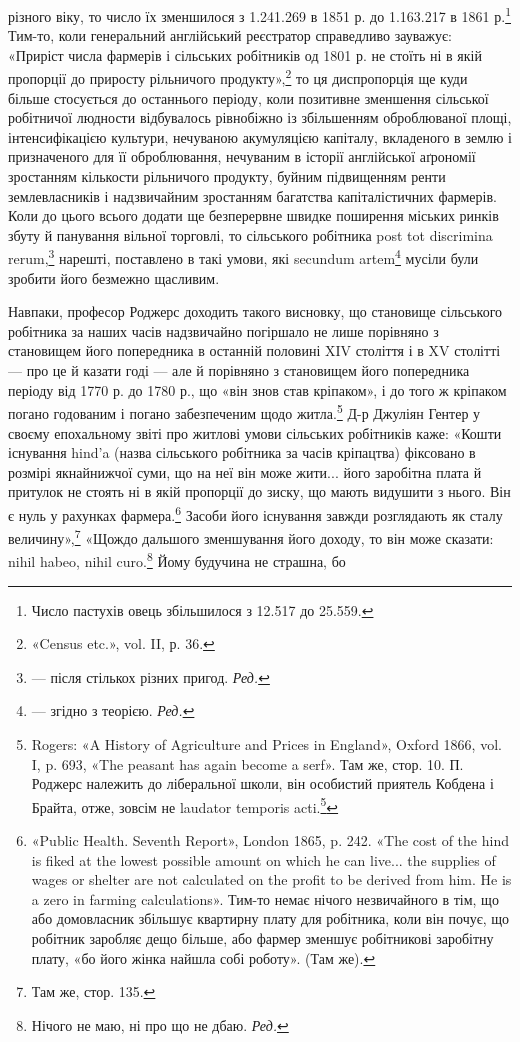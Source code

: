 різного віку, то число їх зменшилося з 1.241.269 в 1851 р. до
1.163.217 в 1861 р.\footnote{
Число пастухів овець збільшилося з 12.517 до 25.559.
} Тим-то, коли генеральний англійський
реєстратор справедливо зауважує: «Приріст числа фармерів і
сільських робітників од 1801 р. не стоїть ні в якій пропорції
до приросту рільничого продукту»,\footnote{
«Census etc.», vol. II, р. 36.
} то ця диспропорція ще
куди більше стосується до останнього періоду, коли позитивне
зменшення сільської робітничої людности відбувалось рівнобіжно
із збільшенням оброблюваної площі, інтенсифікацією культури,
нечуваною акумуляцією капіталу, вкладеного в землю і призначеного
для її оброблювання, нечуваним в історії англійської
аґрономії зростанням кількости рільничого продукту, буйним
підвищенням ренти землевласників і надзвичайним зростанням
багатства капіталістичних фармерів. Коли до цього всього додати
ще безперервне швидке поширення міських ринків збуту й
панування вільної торговлі, то сільського робітника post tot
discrimina rerum,\footnote*{
— після стількох різних пригод. \emph{Ред.}
} нарешті, поставлено в такі умови, які secundum
artem\footnote*{
— згідно з теорією. \emph{Ред.}
} мусіли були зробити його безмежно щасливим.

Навпаки, професор Роджерс доходить такого висновку, що
становище сільського робітника за наших часів надзвичайно
погіршало не лише порівняно з становищем його попередника
в останній половині XIV століття і в XV столітті — про це й
казати годі — але й порівняно з становищем його попередника
періоду від 1770 р. до 1780 р., що «він знов став кріпаком», і
до того ж кріпаком погано годованим і погано забезпеченим щодо
житла.\footnote{
Rogers: «A History of Agriculture and Prices in England», Oxford
1866, vol. I, p. 693, «The peasant has again become a serf». Там же, стор. 10.
П. Роджерс належить до ліберальної школи, він особистий приятель
Кобдена і Брайта, отже, зовсім не laudator temporis acti.\footnote*{
— хвалій минулих часів. \emph{Ред.}
}
} Д-р Джуліян Гентер у своєму епохальному звіті про
житлові умови сільських робітників каже: «Кошти існування
hind’a (назва сільського робітника за часів кріпацтва) фіксовано
в розмірі якнайнижчої суми, що на неї він може жити... його
заробітна плата й притулок не стоять ні в якій пропорції до зиску,
що мають видушити з нього. Він є нуль у рахунках фармера.\footnote{
«Public Health. Seventh Report», London 1865, p. 242. «The cost of
the hind is fiked at the lowest possible amount on which he can live... the
supplies of wages or shelter are not calculated on the profit to be derived
from him. He is a zero in farming calculations». Тим-то немає нічого незвичайного
в тім, що або домовласник збільшує квартирну плату для робітника,
коли він почує, що робітник заробляє дещо більше, або фармер
зменшує робітникові заробітну плату, «бо його жінка найшла собі
роботу». (Там же).
}
Засоби його існування завжди розглядають як сталу величину»,\footnote{
Там же, стор. 135.
}
«Щождо дальшого зменшування його доходу, то він може сказати:
nihil habeo, nihil curo.\footnote*{
Нічого не маю, ні про що не дбаю. \emph{Ред.}
} Йому будучина не страшна, бо